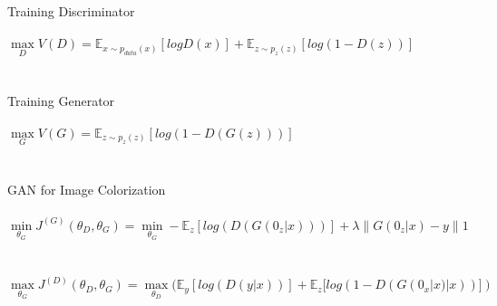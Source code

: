 \documentclass[12pt]{article}
\begin{document}
Training Discriminator \\ \\
$\max \limits_{D} V(D) =  \mathbb{E}_{x\sim p_{data}(x)}[log D(x)] +  \mathbb{E}_{z\sim p_{z}(z)}[log (1-D(z))]$
\\ \\ \\
Training Generator \\ \\
$\max \limits_{G} V(G) = \mathbb{E}_{z\sim p_{z}(z)}[log(1 - D(G(z)))]$
\\ \\ \\
GAN for Image Colorization \\ \\ 
$\min \limits_{\theta_{G}} J^{(G)}(\theta_{D},\theta_{G}) = \min \limits_{\theta_{G}}-\mathbb{E}_z[log(D(G(0_z|x)))]+  \lambda\parallel G(0_z|x)-y\parallel 1$
\\ \\ \\
$\max \limits_{\theta_{G}} J^{(D)}(\theta_{D},\theta_{G}) =  \max \limits_{\theta_{D}}(\mathbb{E}_y[log(D(y|x))]+  \mathbb{E}_z[log(1-D(G(0_x|x)|x))])$
\\ \\ \\
\end{document}
